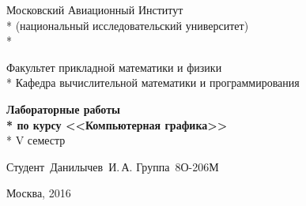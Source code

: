 \documentclass[a4paper, 12pt]{article}
\begin{document}
\begin{titlepage}

\newpage

\begin{center}
Московский Авиационный Институт \\*
(национальный исследовательский университет) \\*

\vspace{2em}

Факультет прикладной математики и физики \\*
Кафедра вычислительной математики и программирования

\vspace{20em}

\Large \textbf{Лабораторные работы \\*
по курсу <<Компьютерная графика>>} \\*
V семестр

\end{center}

\vspace{15em}

\hspace{30em}\vbox{
	\hbox{Студент Данилычев И.\,А.}
	\hbox{Группа 8О-206М}
}

\vspace{\fill}

\begin{center}
Москва, 2016
\end{center}

\end{titlepage}
\end{document}
